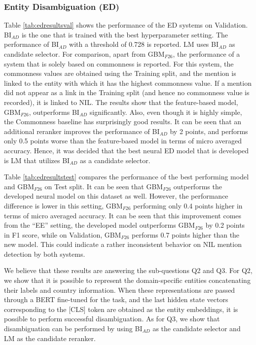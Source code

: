\documentclass{report}
\theoremstyle{definition}
\theoremstyle{remark}
\begin{document}
\subsubsection{Entity Disambiguation (ED)}
Table \ref{tab:edresultsval} shows the performance of the ED systems on Validation. BI$_{AD}$ is the one that is trained with the best hyperparameter setting. The performance of BI$_{AD}$ with a threshold of 0.728 is reported. LM uses BI$_{AD}$ as candidate selector. For comparison, apart from GBM$_{F26}$, the performance of a system that is solely based on commonness is reported. For this system, the commonness values are obtained using the Training split, and the mention is linked to the entity with which it has the highest commonness value. If a mention did not appear as a link in the Training split (and hence no commonness value is recorded), it is linked to NIL. The results show that the feature-based model, GBM$_{F26}$, outperforms BI$_{AD}$ significantly. Also, even though it is highly simple, the Commonness baseline has surprisingly good results. It can be seen that an additional reranker improves the performance of BI$_{AD}$ by 2 points, and performs only 0.5 points worse than the feature-based model in terms of micro averaged accuracy. Hence, it was decided that the best neural ED model that is developed is LM that utilizes BI$_{AD}$ as a candidate selector.

Table \ref{tab:edresultstest} compares the performance of the best performing model and GBM$_{F26}$ on Test split. It can be seen that GBM$_{F26}$ outperforms the developed neural model on this dataset as well. However, the performance difference is lower in this setting, GBM$_{F26}$ performing only 0.4 points higher in terms of micro averaged accuracy. It can be seen that this improvement comes from the ``EE'' setting, the developed model outperforms GBM$_{F26}$ by 0.2 points in F1 score, while on Validation, GBM$_{F26}$ performs 0.7 points higher than the new model. This could indicate a rather inconsistent behavior on NIL mention detection by both systems.

We believe that these results are answering the sub-questions Q2 and Q3. For Q2, we show that it is possible to represent the domain-specific entities concatenating their labels and country information. When these representations are passed through a BERT fine-tuned for the task, and the last hidden state vectors corresponding to the [CLS] token are obtained as the entity embeddings, it is possible to perform successful disambiguation. As for Q3, we show that disambiguation can be performed by using BI$_{AD}$ as the candidate selector and LM as the candidate reranker.
\end{document}
